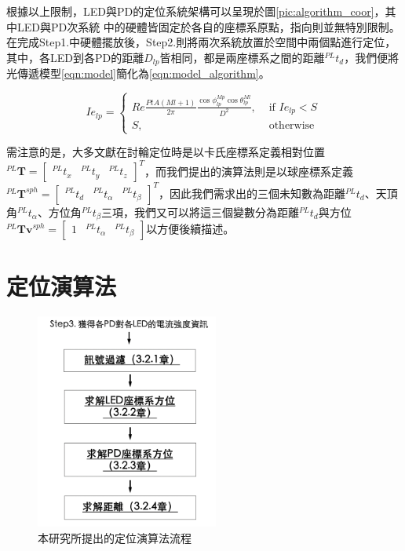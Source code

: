     根據以上限制，LED與PD的定位系統架構可以呈現於圖\ref{pic:algorithm_coor}，其中LED與PD次系統
    中的硬體皆固定於各自的座標系原點，指向則並無特別限制。在完成Step1.中硬體擺放後，Step2.則將兩次系統放置於空間中兩個點進行定位，其中，各LED到各PD的距離$D_{lp}$皆相同，都是兩座標系之間的距離$^{PL}t_d$，我們便將光傳遞模型\ref{eqn:model}簡化為\ref{eqn:model_algorithm}。

    \begin{equation}
        \label{eqn:model_algorithm}
        Ie_{lp} = \begin{cases}Re\frac{PtA(Ml+1)}{2\pi}\frac{\cos\phi_{lp}^{Mp}\cos \theta_{lp}^{Ml}}{D^2} , & \text { if } Ie_{lp}<S \\ S, & \text { otherwise }\end{cases}
    \end{equation}

    需注意的是，大多文獻在討輪定位時是以卡氏座標系定義相對位置$^{PL}\boldsymbol{T}=\left[\begin{array}{ccc}^{PL}t_x&^{PL}t_y&^{PL}t_z\end{array}\right]^T$，而我們提出的演算法則是以球座標系定義$^{PL}\boldsymbol{T}^{sph}=\left[\begin{array}{ccc}^{PL}t_d&^{PL}t_{\alpha}&^{PL}t_{\beta}\end{array}\right]^T$，因此我們需求出的三個未知數為距離$^{PL}t_d$、天頂角$^{PL}t_\alpha$、方位角$^{PL}t_\beta$三項，我們又可以將這三個變數分為距離$^{PL}t_d$與方位$^{PL}\boldsymbol{Tv}^{sph} = \left[\begin{array}{ccc}1&^{PL}t_{\alpha}&^{PL}t_{\beta}\end{array}\right]$以方便後續描述。



\section{定位演算法}
\label{chp:algorithm}

\begin{figure}[htpb]
    \centering
    \includegraphics[width=6cm]{ch3pic/algorithm_flow.png}
    \caption{本研究所提出的定位演算法流程}
    \label{pic:algorithm_flow}
\end{figure}


